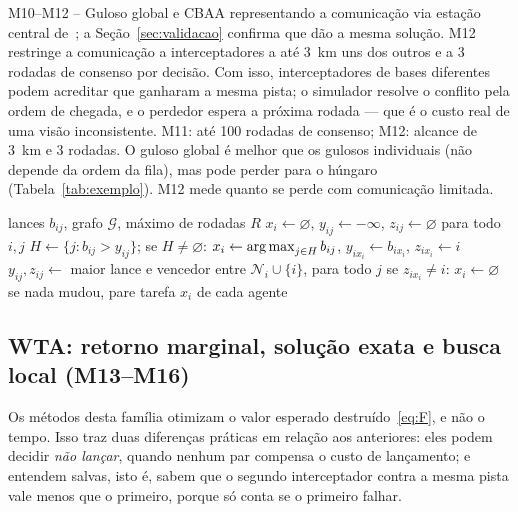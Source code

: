 \begin{metodo}{M10--M12 -- Guloso global e CBAA}
representando a comunicação via estação central de~\cite{feitosa2025}; a Seção~\ref{sec:validacao} confirma que dão a mesma
solução. M12 restringe a comunicação a interceptadores a até 3~km uns dos outros e a 3 rodadas de consenso por decisão.
Com isso, interceptadores de bases diferentes podem acreditar que ganharam a mesma pista; o simulador resolve o conflito
pela ordem de chegada, e o perdedor espera a próxima rodada --- que é o custo real de uma visão inconsistente.
\parm M11: até 100 rodadas de consenso; M12: alcance de 3~km e 3 rodadas.
\espera O guloso global é melhor que os gulosos individuais (não depende da ordem da fila), mas pode perder para o húngaro
(Tabela~\ref{tab:exemplo}). M12 mede quanto se perde com comunicação limitada.
\end{metodo}

\begin{algorithm}[H]
\caption{CBAA: consenso sobre lances, uma tarefa por agente (M11, M12).}\label{alg:cbaa}
\begin{algorithmic}[1]
\Require lances $b_{ij}$, grafo $\mathcal{G}$, máximo de rodadas $R$
\State $x_i\gets\varnothing$, $y_{ij}\gets-\infty$, $z_{ij}\gets\varnothing$ para todo $i,j$
   
    \State $H\gets\{j: b_{ij}>y_{ij}\}$; se $H\neq\varnothing$: $x_i\gets\operatorname*{arg\,max}_{j\in H}b_{ij}$, $y_{ix_i}\gets b_{ix_i}$, $z_{ix_i}\gets i$
  \EndFor
   
    \State $y_{ij},z_{ij}\gets$ maior lance e vencedor entre $\mathcal{N}_i\cup\{i\}$, para todo $j$
    \State se $z_{ix_i}\ne i$: $x_i\gets\varnothing$
  \EndFor
  \State se nada mudou, pare
\EndFor
\Ensure tarefa $x_i$ de cada agente
\end{algorithmic}
\end{algorithm}

\subsection{WTA: retorno marginal, solução exata e busca local (M13--M16)}
Os métodos desta família otimizam o valor esperado destruído~\eqref{eq:F}, e não o tempo. Isso traz duas diferenças
práticas em relação aos anteriores: eles podem decidir \emph{não lançar}, quando nenhum par compensa o custo de
lançamento; e entendem salvas, isto é, sabem que o segundo interceptador contra a mesma pista vale menos que o primeiro,
porque só conta se o primeiro falhar.

